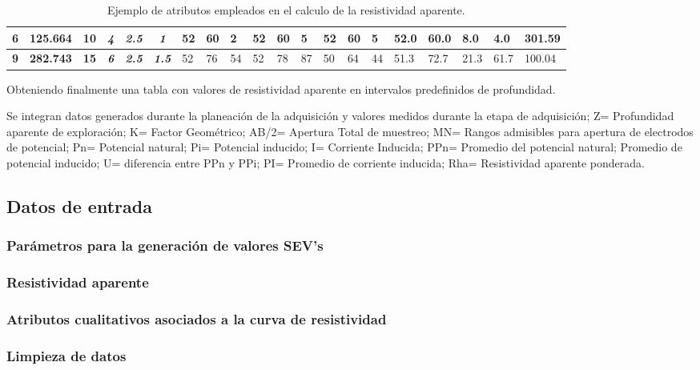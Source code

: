 \begin{table}[]
{\begin{tabular}{c|c|c|c|c|c|l|l|l|l|l|l|l|l|l|l|l|l|l|l}
			\rowcolor[HTML]{FFFFFF} 
			\textbf{6} & \textbf{125.664} & \textbf{10} & \textit{\textbf{4}} & \textit{\textbf{2.5}} & \textit{\textbf{1}} & 52 & 60 & 2 & 52 & 60 & 5 & 52 & 60 & 5 & 52.0 & 60.0 & 8.0 & 4.0 & 301.59 \\ \hline
			\rowcolor[HTML]{FFFFFF} 
			\textbf{9} & \textbf{282.743} & \textbf{15} & \textit{\textbf{6}} & \textit{\textbf{2.5}} & \textit{\textbf{1.5}} & 52 & 76 & 54 & 52 & 78 & 87 & 50 & 64 & 44 & 51.3 & 72.7 & 21.3 & 61.7 & 100.04
		\end{tabular}%
	}
	\caption{Ejemplo de atributos empleados en el calculo de la resistividad aparente.}
	\label{tab:T1}
\end{table}
	
	Obteniendo finalmente una tabla con valores de resistividad aparente en intervalos predefinidos de profundidad.
	
	Se integran datos generados durante la planeación de la adquisición y valores medidos durante la etapa de adquisición; Z= Profundidad aparente de exploración; K= Factor Geométrico; AB/2= Apertura Total de muestreo;  MN= Rangos admisibles para apertura de electrodos de potencial; Pn= Potencial natural; Pi= Potencial inducido; I= Corriente Inducida; PPn= Promedio del potencial natural; Promedio de potencial inducido; U= diferencia entre PPn y PPi; PI= Promedio de corriente inducida; Rha= Resistividad aparente ponderada.
	
	
	\subsection{Datos de entrada}
		
		\subsubsection{Parámetros para la generación de valores SEV’s}
		\subsubsection{Resistividad aparente}
		\subsubsection{Atributos cualitativos asociados a la curva de resistividad}
		\subsubsection{Limpieza de datos}

